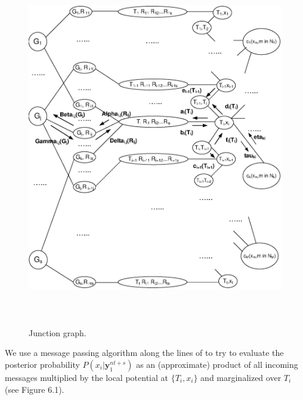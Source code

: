 \begin{figure}\label{juncfig}
\vspace{0.0in}\hspace{0.0in}\includegraphics[width=5.0in,height=6.2in]{Drawing11new.eps}
\caption{Junction graph.}
\end{figure}




We use a message passing algorithm along the lines of \cite{aji} to
try to evaluate  the posterior probability
$P(x_i|\mathbf{y}_1^{nt+s})$ as an (approximate) product of all
incoming messages multiplied by the local potential at $\{T_i,x_i\}$
and marginalized over $T_i$ (see  Figure 6.1).%

